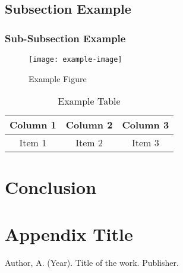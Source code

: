 \documentclass[12pt]{article}
\begin{document}
\subsection{Subsection Example}
\lipsum[4]

\subsubsection{Sub-Subsection Example}
\lipsum[5]

\begin{figure}[H]
    \centering
    \texttt{[image: example-image]}
    \caption{Example Figure}
    \label{fig:example}
\end{figure}

\begin{table}[H]
    \centering
    \begin{tabular}{|c|c|c|}
        \hline
        Column 1 & Column 2 & Column 3 \\
        \hline
        Item 1 & Item 2 & Item 3 \\
        \hline
    \end{tabular}
    \caption{Example Table}
    \label{tab:example}
\end{table}

\section{Conclusion}
\lipsum[6] %

\appendix
\section{Appendix Title}
\lipsum[7] %

\begin{thebibliography}{99}
 Author, A. (Year). Title of the work. Publisher.
\end{thebibliography}
\end{document}
